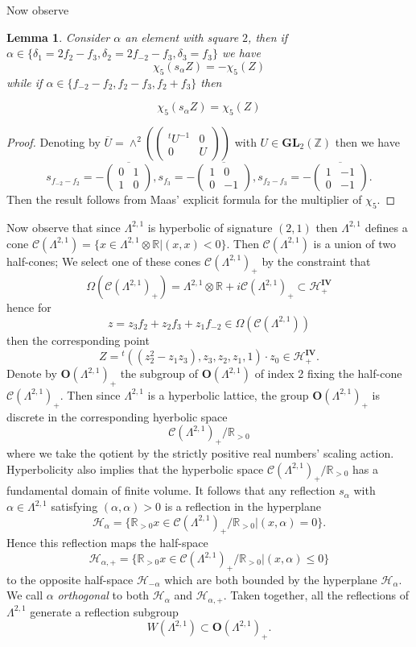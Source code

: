 \documentclass[9pt]{amsart} \usepackage[utf8]{inputenc}
\newtheorem{lemma}{Lemma}
\newcommand{\Z}{\mathbb{Z}} \newcommand{\C}{\mathbb{C}}
\newcommand{\R}{\mathbb{R}} \newcommand{\La}{\Lambda}
\newcommand{\GL}{\mathbf{GL}}
\newcommand{\Orth}{\mathbf{O}}
\newcommand{\Hpl}{\mathcal{H}}
\newcommand{\IV}{\mathbf{IV}}
\newcommand{\Cone}{\mathcal{C}}
\begin{document}
Now observe
\begin{lemma}
Consider $\alpha$ an element with square $2$, then if $\alpha \in
\{\delta_1 = 2f_2 -f_3, \delta_2 = 2f_{-2} - f_3, \delta_3 = f_3\}$ we
have
$$\chi_5(s_{\alpha}Z) = - \chi_5(Z)$$
while if $\alpha \in \{f_{-2} - f_2, f_2 - f_3, f_2 + f_3\}$ then

$$\chi_5(s_{\alpha}Z) = \chi_5(Z)$$
\end{lemma}
\begin{proof}
Denoting by $\overline{U} = \wedge^2(\begin{pmatrix}{}^tU^{-1} & 0\\ 0 &
U\end{pmatrix})$ with $U \in
\GL_2(\Z)$ then we have $$s_{f_{-2} - f_2} = -\overline{\begin{pmatrix}0
& 1\\ 1 &0\end{pmatrix}}, s_{f_3} = - \overline{\begin{pmatrix}1& 0\\  0
&-1\end{pmatrix}}, s_{f_2 - f_3} =
-\overline{\begin{pmatrix}1 & -1\\ 0 & -1\end{pmatrix}}.$$ Then the result follows from Maas' explicit
formula for the multiplier of $\chi_5.$
\end{proof}

Now observe that since $\La^{2,1}$ is hyperbolic of signature $(2,1)$
then $\La^{2,1}$ defines a cone $\Cone(\La^{2,1}) = \{ x \in \La^{2,1}
\otimes \R | (x,x) < 0\}$. Then $\Cone(\La^{2,1})$ is a union of two
half-cones; We select one of these cones $\Cone(\La^{2,1})_+$ by the
constraint that $$\Omega(\Cone(\La^{2,1})_+) = \La^{2,1} \otimes \R
+i\Cone(\La^{2,1})_+ \subset \Hpl^{\IV}_+$$ hence for $$z = z_3 f_2 + z_2
f_3 + z_1 f_{-2} \in \Omega(\Cone(\La^{2,1}))$$ then the corresponding
point $$Z = {}^t ((z_2^2 - z_1z_3), z_3, z_2, z_1, 1) \cdot z_0 \in
\Hpl^{\IV}_+.$$ Denote by $\Orth(\La^{2,1})_+$ the subgroup of
$\Orth(\La^{2,1})$ of index 2 fixing the half-cone
$\Cone(\Lambda^{2,1})_+$. Then since $\La^{2,1}$ is a hyperbolic
lattice, the group $\Orth(\La^{2,1})_+$ is discrete in the corresponding
hyerbolic space $$\Cone(\La^{2,1})_+ / \R_{>0}$$ where we take the
qotient by the strictly positive real numbers' scaling action.
Hyperbolicity also implies that the hyperbolic space
$\Cone(\La^{2,1})_+ / \R_{>0}$ has a fundamental domain of finite
volume. It follows that any reflection $s_{\alpha}$ with $\alpha \in
\La^{2,1}$ satisfying $(\alpha,\alpha) > 0$ is a reflection in the
hyperplane $$\Hpl_{\alpha} = \{ \R_{>0}x \in \Cone(\La^{2,1})_+/\R_{>0} |
(x,\alpha) = 0\}.$$ Hence this reflection maps the half-space
$$\Hpl_{\alpha,+} = \{\R_{>0} x \in \Cone(\La^{2,1})_+/\R_{>0} |
(x,\alpha) \leq  0\}$$ to the opposite half-space $\Hpl_{-\alpha}$ which
are both bounded by the hyperplane $\Hpl_{\alpha}$. We call $\alpha$
\textit{orthogonal} to both $\Hpl_{\alpha}$ and $\Hpl_{\alpha,+}$. Taken
together, all the reflections of $\Lambda^{2,1}$ generate a reflection
subgroup $$W(\La^{2,1}) \subset \Orth(\La^{2,1})_+.$$
\end{document}
